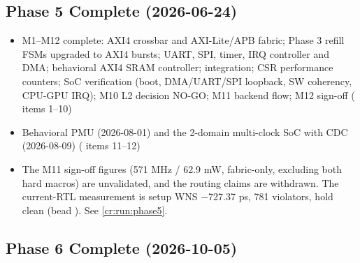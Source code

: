 \subsection{\texorpdfstring{Phase 5 Complete \ok{}
(2026-06-24)}{Phase 5 Complete  (2026-06-24)}}\label{cr:status:phase-history:phase-5-complete-white-check-mark-2026-06-24}

\begin{record}

\begin{itemize}
\tightlist
\item
  \ok{} M1--M12 complete: AXI4 crossbar and AXI-Lite/\allowbreak{}APB
  fabric; Phase 3 refill FSMs upgraded to AXI4 bursts; UART, SPI, timer,
  IRQ controller and DMA; behavioral AXI4 SRAM controller;
   integration; CSR performance counters; SoC verification
  (boot, DMA/\allowbreak{}UART/\allowbreak{}SPI loopback, SW coherency,
  CPU-GPU IRQ); M10 L2 decision NO-GO; M11 backend flow; M12 sign-off
  ( items 1--10)
\item
  \ok{} Behavioral PMU (2026-08-01) and the 2-domain multi-clock SoC
  with CDC (2026-08-09) ( items 11--12)
\item
  \warn{} The M11 sign-off figures (571 MHz / 62.9 mW, fabric-only,
  excluding both hard macros) are unvalidated, and the routing claims
  are withdrawn. The current-RTL measurement is setup WNS −727.37 ps,
  781 violators, hold clean (bead ). See
  \cref{cr:run:phase5}.
\end{itemize}

\end{record}

\subsection{\texorpdfstring{Phase 6 Complete \ok{}
(2026-10-05)}{Phase 6 Complete  (2026-10-05)}}\label{cr:status:phase-history:phase-6-complete-white-check-mark-2026-10-05}

